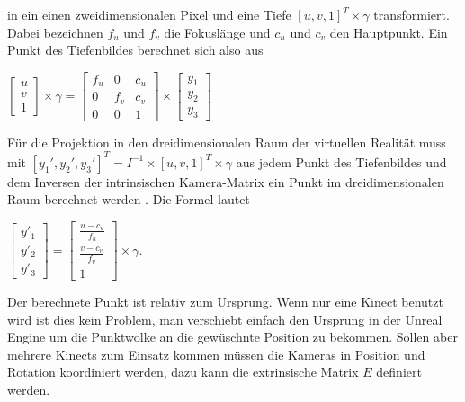 \documentclass[a4paper]{IEEEtran}
\begin{document}
	in ein einen zweidimensionalen Pixel und eine Tiefe $[u,v,1]^T \times \gamma$ transformiert. 
	Dabei bezeichnen $f_u$ und $f_v$ die Fokuslänge und $c_u$ und $c_v$ den Hauptpunkt. 
	Ein Punkt des Tiefenbildes berechnet sich also aus \\[1cm]

\begin{center}
$\begin{bmatrix}
u \\
v \\
1
\end{bmatrix}
\times
\gamma
= \begin{bmatrix}
f_u & 0 & c_u  \\
0 & f_v & c_v  \\
0 & 0 & 1  
\end{bmatrix}
\times
\begin{bmatrix}
y_1 \\
y_2 \\
y_3
\end{bmatrix}$\\[1cm]
\end{center}

	Für die Projektion in den dreidimensionalen Raum der virtuellen Realität muss mit $[y_1',y_2',y_3']^T = I^{-1} \times [u,v,1]^T \times \gamma$ aus jedem Punkt des Tiefenbildes und dem Inversen der intrinsischen Kamera-Matrix ein Punkt im dreidimensionalen Raum berechnet werden \cite{TEO}.
	Die Formel lautet \\[1cm]

\begin{center}
$\begin{bmatrix}
y'_1 \\
y'_2 \\
y'_3
\end{bmatrix}
= \begin{bmatrix}
\frac{u - c_u}{f_u} \\
\frac{v - c_v}{f_v}  \\
1  
\end{bmatrix}
\times
\gamma$.\\[1cm]
\end{center}

	Der berechnete Punkt ist relativ zum Ursprung. 
	Wenn nur eine Kinect benutzt wird ist dies kein Problem, man verschiebt einfach den Ursprung in der Unreal Engine um die Punktwolke an die gewüschnte Position zu bekommen. 
	Sollen aber mehrere Kinects zum Einsatz kommen müssen die Kameras in Position und Rotation koordiniert werden, dazu kann die extrinsische Matrix $E$ definiert werden. \\[1cm]
\end{document}
